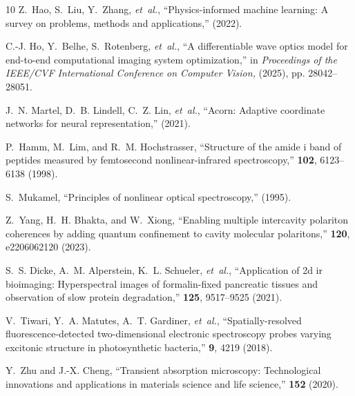 \documentclass{optica-article}
\begin{document}
\begin{thebibliography}{10}
Z.~Hao, S.~Liu, Y.~Zhang, \emph{et~al.}, \enquote{Physics-informed machine learning: A survey on problems, methods and applications,} {\protect{}}  (2022).

C.-J. Ho, Y.~Belhe, S.~Rotenberg, \emph{et~al.}, \enquote{A differentiable wave optics model for end-to-end computational imaging system optimization,} in \emph{Proceedings of the IEEE/CVF International Conference on Computer Vision,}  (2025), pp. 28042--28051.

J.~N. Martel, D.~B. Lindell, C.~Z. Lin, \emph{et~al.}, \enquote{Acorn: Adaptive coordinate networks for neural representation,} {\protect{}}  (2021).

P.~Hamm, M.~Lim, and R.~M. Hochstrasser, \enquote{Structure of the amide i band of peptides measured by femtosecond nonlinear-infrared spectroscopy,} {\protect{}} \textbf{102}, 6123--6138 (1998).

S.~Mukamel, \enquote{Principles of nonlinear optical spectroscopy,} {\protect{}}  (1995).

Z.~Yang, H.~H. Bhakta, and W.~Xiong, \enquote{Enabling multiple intercavity polariton coherences by adding quantum confinement to cavity molecular polaritons,} {\protect{}} \textbf{120}, e2206062120 (2023).

S.~S. Dicke, A.~M. Alperstein, K.~L. Schueler, \emph{et~al.}, \enquote{Application of 2d ir bioimaging: Hyperspectral images of formalin-fixed pancreatic tissues and observation of slow protein degradation,} {\protect{}} \textbf{125}, 9517--9525 (2021).

V.~Tiwari, Y.~A. Matutes, A.~T. Gardiner, \emph{et~al.}, \enquote{Spatially-resolved fluorescence-detected two-dimensional electronic spectroscopy probes varying excitonic structure in photosynthetic bacteria,} {\protect{}} \textbf{9}, 4219 (2018).

Y.~Zhu and J.-X. Cheng, \enquote{Transient absorption microscopy: Technological innovations and applications in materials science and life science,} {\protect{}} \textbf{152} (2020).


\end{thebibliography}
\end{document}
